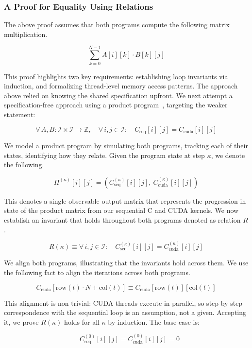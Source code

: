\documentclass{article}
\begin{document}
\subsubsection{A Proof for Equality Using Relations}

The above proof assumes that both programs compute the following matrix multiplication.

$$\sum_{k=0}^{N-1} A[i][k] \cdot B[k][j]$$

This proof highlights two key requirements: establishing loop invariants via induction, and formalizing thread-level memory access patterns. The approach above relied on knowing the shared specification upfront. We next attempt a specification-free approach using a product program~\cite{Barthe2011RelationalVU}, targeting the weaker statement:

$$\forall\, A, B : \mathcal{I} \times \mathcal{I} \to \mathbb{Z}, \quad \forall\, i, j \in \mathcal{I}: \quad C_{\text{seq}}[i][j] = C_{\text{cuda}}[i][j]$$

We model a product program by simulating both programs, tracking each of their states, identifying how they relate. Given the program state at step $\kappa$, we denote the following.

$$\Pi^{(\kappa)}[i][j] = \left( C_{\text{seq}}^{(\kappa)}[i][j],\ C_{\text{cuda}}^{(\kappa)}[i][j] \right)$$

This denotes a single observable output matrix that represents the progression in state of the product matrix from our sequential C and CUDA kernels. We now establish an invariant that holds throughout both programs denoted as relation $R$.

$$R(\kappa) \equiv \forall\, i,j \in \mathcal{I}: \quad C_{\text{seq}}^{(\kappa)}[i][j] = C_{\text{cuda}}^{(\kappa)}[i][j]$$

We align both programs, illustrating that the invariants hold across them. We use the following fact to align the iterations across both programs.

$$C_{\text{cuda}}[\text{row}(t) \cdot N + \text{col}(t)] \equiv C_{\text{cuda}}[\text{row}(t)][\text{col}(t)]$$ 

This alignment is non-trivial: CUDA threads execute in parallel, so step-by-step correspondence with the sequential loop is an assumption, not a given. Accepting it, we prove $R(\kappa)$ holds for all $\kappa$ by induction. The base case is:

$$\quad C^{(0)}_{\text{seq}}[i][j] = C^{(0)}_{\text{cuda}}[i][j] = 0$$
\end{document}
